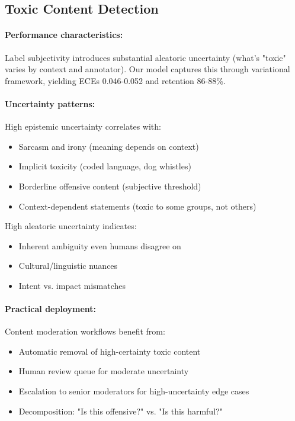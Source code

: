 \documentclass[12pt,a4paper]{article}
\theoremstyle{definition}
\begin{document}
\subsection{Toxic Content Detection}

\paragraph{Performance characteristics:}
Label subjectivity introduces substantial aleatoric uncertainty (what's "toxic" varies by context and annotator). Our model captures this through variational framework, yielding ECEs 0.046-0.052 and retention 86-88\%.

\paragraph{Uncertainty patterns:}
High epistemic uncertainty correlates with:
\begin{itemize}
\item Sarcasm and irony (meaning depends on context)
\item Implicit toxicity (coded language, dog whistles)
\item Borderline offensive content (subjective threshold)
\item Context-dependent statements (toxic to some groups, not others)
\end{itemize}

High aleatoric uncertainty indicates:
\begin{itemize}
\item Inherent ambiguity even humans disagree on
\item Cultural/linguistic nuances
\item Intent vs. impact mismatches
\end{itemize}

\paragraph{Practical deployment:}
Content moderation workflows benefit from:
\begin{itemize}
\item Automatic removal of high-certainty toxic content
\item Human review queue for moderate uncertainty
\item Escalation to senior moderators for high-uncertainty edge cases
\item Decomposition: "Is this offensive?" vs. "Is this harmful?"
\end{itemize}
\end{document}
